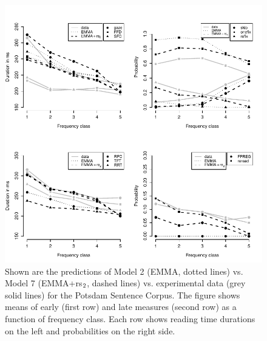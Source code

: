 \begin{figure}[!htbp]
\begin{center}
\includegraphics[width=\textwidth]{figures/fig-psc-fstat}
\end{center}
\caption{Shown are the predictions of Model 2 (EMMA, dotted lines) vs. Model 7 (EMMA+rs$\protect  _2$, dashed lines) vs. experimental data (grey solid lines) for the Potsdam Sentence Corpus. The figure shows means of early (first row) and late measures (second row) as a function of frequency class. Each row shows reading time durations on the left and probabilities on the right side.}
\label{fig:psc}
\end{figure}


